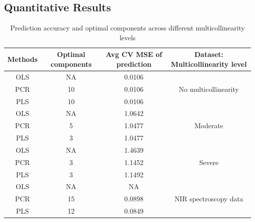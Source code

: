 \documentclass[11pt,twoside,a4paper]{article}
\begin{document}
\newpage
\subsection{Quantitative Results}

\begin{table}[h]
    \centering
    \begin{tabular}{|c|c|c|c|}
        \hline
        Methods & Optimal components & Avg CV MSE of prediction & Dataset: Multicollinearity level \\
        \hline
        OLS & NA & 0.0106 & \multirow{3}{*}{No multicollinearity} \\
        PCR & 10 & 0.0106 &  \\
        PLS & 10 & 0.0106 &  \\
        \hline
        OLS & NA & 1.0642 & \multirow{3}{*}{Moderate} \\        
        PCR & 5 & 1.0477 &  \\
        PLS & 3 & 1.0477 &  \\
        \hline
        OLS & NA & 1.4639 & \multirow{3}{*}{Severe} \\
        PCR & 3 & 1.1452 &  \\
        PLS & 3 & 1.1492 &  \\ 
        \hline  
        OLS & NA & NA & \multirow{3}{*}{NIR spectroscopy data} \\
        PCR & 15 & 0.0898 &  \\
        PLS & 12 & 0.0849 &  \\ 
        \hline
    \end{tabular}
    \caption{Prediction accuracy and optimal components across different multicollinearity levels}
    \label{tab:multicollinearity_comparison}
\end{table}
\end{document}
